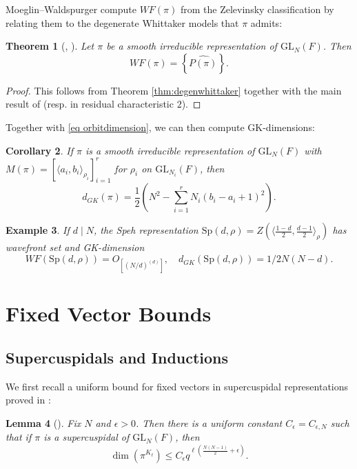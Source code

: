 \documentclass{amsart}
\newcommand{\lf}{\left}
\newcommand{\ri}{\right}
\newcommand{\f}{\frac}
\newcommand{\wh}{\widehat}
\newcommand{\Sp}{\mathrm{Sp}}
\newcommand{\GL}{\mathrm{GL}}
\newcommand{\eps}{\epsilon}
\newcommand{\1}{\m 1}
\newtheorem{thm}{Theorem}[subsection]
\newtheorem{cor}[thm]{Corollary}
\newtheorem{lem}[thm]{Lemma}
\newtheorem{ex}[thm]{Example}
\theoremstyle{remark}
\theoremstyle{definition}
\numberwithin{equation}{subsection}
\begin{document}
Moeglin--Waldspurger compute $WF(\pi)$ from the Zelevinsky classification by relating them to the degenerate Whittaker models that $\pi$ admits:


\begin{thm}[{\cite{MW87}, \cite{Var14}}]\label{thm:wavefront}
Let $\pi$ be a smooth irreducible representation of $\GL_N(F)$. Then 
\[ 
WF(\pi) = \left\{\wh{ P(\pi)}\right\}. 
\] 
\end{thm}

\begin{proof}
This follows from Theorem \ref{thm:degenwhittaker} together with the main result of \cite{MW87} (resp. \cite{Var14} in residual characteristic $2$). 
\end{proof}

Together with \eqref{eq orbitdimension}, we can then compute GK-dimensions:

\begin{cor}\label{cor:gkdimform}
If $\pi$ is a smooth irreducible representation of $\GL_N(F)$ with $M(\pi) = [\langle a_i,b_i \rangle_{\rho_i}]_{i=1}^r$ for $\rho_i$ on $\GL_{N_i}(F)$, then
\[
d_{GK}(\pi) = \f12 \lf(N^2 - \sum_{i=1}^r N_i (b_i - a_i + 1)^2 \ri). 
\]
\end{cor}

\begin{ex}\label{ex: Speh invariants}
If $d \mid N$, the Speh representation %
$\Sp(d,\rho) = Z(\langle \frac{1-d}{2}, \frac{d-1}{2} \rangle_\rho)$ has wavefront set and GK-dimension \[
WF(\Sp(d,\rho)) =O_{[(N/d)^{(d)}]}, \quad d_{GK}(\Sp(d,\rho)) = 1/2N(N-d).
\]  
\end{ex}





\section{Fixed Vector Bounds}\label{sec:fixedvector}

\subsection{Supercuspidals and Inductions}
We first recall a uniform bound for fixed vectors in supercuspidal representations proved in \cite{MS19}:
\begin{lem}[{\cite[Lem A.1]{MS19}}]\label{lem:supercuspidal bound}
Fix $N$ and $\eps > 0$. Then there is a uniform constant $C_\eps = C_{\eps,N}$ such that if $\pi$ is a supercuspidal of $\GL_N(F)$, then 
\begin{equation*} \label{eq: uniform upper bound sc}
\dim(\pi^{K_\ell}) \leq C_\epsilon q^{\ell \left(\frac{N(N-1)}{2} + \eps \right)}. 
\end{equation*}
\end{lem}
\end{document}
